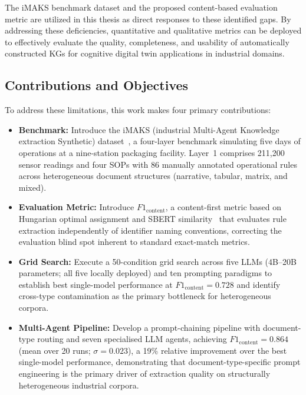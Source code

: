 ﻿\documentclass[11pt]{article}
\begin{document}
The iMAKS benchmark dataset and the proposed content-based evaluation metric are utilized in this thesis as direct responses to these identified gaps. By addressing these deficiencies, quantitative and qualitative metrics can be deployed to effectively evaluate the quality, completeness, and usability of automatically constructed KGs for cognitive digital twin applications in industrial domains.

\subsection{Contributions and Objectives}
To address these limitations, this work makes four primary contributions:
\begin{itemize}
    \item \textbf{Benchmark:} Introduce the iMAKS (industrial Multi-Agent Knowledge
          extraction Synthetic) dataset~\cite{bernardini2026imaks}, a four-layer
          benchmark simulating five days of operations at a nine-station packaging
          facility. Layer~1 comprises 211{,}200 sensor readings and four SOPs with
          86 manually annotated operational rules across heterogeneous document
          structures (narrative, tabular, matrix, and mixed).
    \item \textbf{Evaluation Metric:} Introduce \(F1_{\text{content}}\), a
          content-first metric based on Hungarian optimal assignment and SBERT
          similarity~\cite{reimers2019sbert} that evaluates rule extraction
          independently of identifier naming conventions, correcting the evaluation
          blind spot inherent to standard exact-match metrics.
    \item \textbf{Grid Search:} Execute a 50-condition grid search across five
          LLMs (4B--20B parameters; all five locally deployed) and ten
          prompting paradigms to establish best single-model performance at
          \(F1_{\text{content}} = 0.728\) and identify cross-type contamination
          as the primary bottleneck for heterogeneous corpora.
    \item \textbf{Multi-Agent Pipeline:} Develop a prompt-chaining pipeline with
          document-type routing and seven specialised LLM agents, achieving
          \(F1_{\text{content}} = 0.864\) (mean over 20 runs; $\sigma = 0.023$),
          a 19\% relative improvement over the best single-model performance,
          demonstrating that document-type-specific prompt engineering is the
          primary driver of extraction quality on structurally heterogeneous
          industrial corpora.
\end{itemize}
\end{document}
